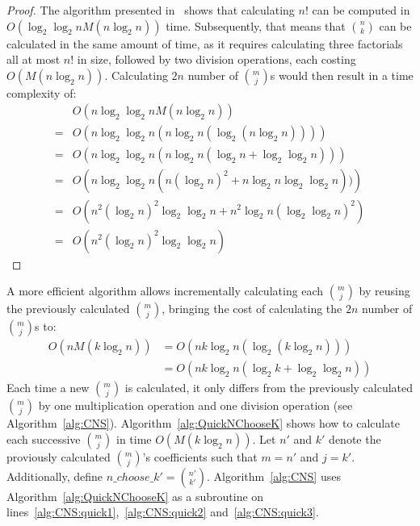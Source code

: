 \begin{proof}
The algorithm presented in~\cite{borwein1985complexity} shows that calculating $n!$ can be computed in $O\left(\log_2\log_2 n M(n \log_2 n)\right)$ time. Subsequently, that means that ${n \choose k}$ can be calculated in the same amount of time, as it requires calculating three factorials all at most $n!$ in size, followed by two division operations, each costing $O\left(M(n \log_2 n)\right)$. Calculating $2n$ number of ${m \choose j}$s would then result in a time complexity of:
\begin{align}
&O\left(n\log_2\log_2 n M(n \log_2 n)\right) \\
=&O\left(n\log_2\log_2 n (n \log_2 n(\log_2 (n \log_2 n)))\right) \\
=&O\left(n\log_2\log_2 n (n \log_2 n(\log_2 n + \log_2\log_2 n))\right) \\
=&O\left(n\log_2\log_2 n (n (\log_2 n)^2 + n \log_2 n \log_2\log_2 n))\right)\\
=&O\left(n^2 (\log_2 n)^2 \log_2\log_2 n + n^2 \log_2 n (\log_2\log_2 n)^2\right) \\
=&O\left(n^2 (\log_2 n)^2 \log_2\log_2 n\right)
\end{align}
\end{proof}
A more efficient algorithm allows incrementally calculating each ${m \choose j}$ by reusing the previously calculated ${m \choose j}$, bringing the cost of calculating the $2n$ number of ${m \choose j}$s to:
\begin{align}
O\left(n M(k \log_2 n)\right) &= O\left(n k \log_2 n(\log_2(k \log_2 n))\right)\\
&= O\left(n k \log_2 n(\log_2 k + \log_2\log_2 n)\right)
\end{align}
Each time a new ${m \choose j}$ is calculated, it only differs from the previously calculated ${m \choose j}$ by one multiplication operation and one division operation (see Algorithm~\ref{alg:CNS}). Algorithm~\ref{alg:QuickNChooseK} shows how to calculate each successive ${m \choose j}$ in time $O\left(M(k \log_2 n)\right)$. Let $n'$ and $k'$ denote the proviously calculated ${m \choose j}$'s coefficients such that $m = n'$ and $j = k'$. Additionally, define $n\_choose\_k'= {n' \choose k'}$. Algorithm~\ref{alg:CNS} uses Algorithm~\ref{alg:QuickNChooseK} as a subroutine on lines~\ref{alg:CNS:quick1},~\ref{alg:CNS:quick2} and~\ref{alg:CNS:quick3}.

